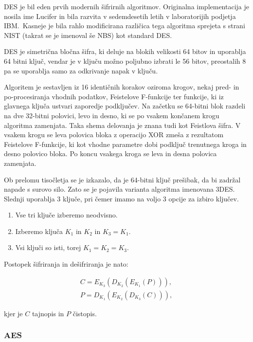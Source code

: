 \documentclass[12pt,a4paper,openany,tikz]{book}
\theoremstyle{plain}
\theoremstyle{definition}
\begin{document}
\gls{DES} je bil eden prvih modernih šifrirnih algoritmov. Originalna implementacija je nosila ime Lucifer in bila razvita v sedemdesetih letih v laboratorijih podjetja IBM.\  Kasneje je bila rahlo modificirana različica tega algoritma sprejeta s strani \acrshort{NIST} (takrat se je imenoval še \acrshort{NBS}) kot standard \gls{DES}.

\gls{DES} je simetrična bločna šifra, ki deluje na blokih velikosti 64 bitov in uporablja 64 bitni ključ, vendar je v ključu možno poljubno izbrati le 56 bitov, preostalih 8 pa se uporablja samo za odkrivanje napak v ključu.

Algoritem je sestavljen iz 16 identičnih korakov oziroma krogov, nekaj pred- in po-procesiranja vhodnih podatkov, Feistelove F-funkcije ter funkcije, ki iz glavnega ključa ustvari zaporedje podključev. Na začetku se 64-bitni blok razdeli na dve 32-bitni polovici, levo in desno, ki se po vsakem končanem krogu algoritma zamenjata. Taka shema delovanja je znana tudi kot Feistlova šifra. V vsakem krogu se leva polovica bloka z operacijo \rm{XOR} zmeša z rezultatom Feistelove F-funkcije, ki kot vhodne parametre dobi podključ trenutnega kroga in desno polovico bloka. Po koncu vsakega kroga se leva in desna polovica zamenjata.

Ob prelomu tisočletja se je izkazalo, da je 64-bitni ključ prešibak, da bi zadržal napade s surovo silo. Zato se je pojavila varianta algoritma imenovana 3DES. Slednji uporablja 3 ključe, pri čemer imamo na voljo 3 opcije za izbiro ključev.

\begin{enumerate}
\item Vse tri ključe izberemo neodvisno.
\item Izberemo ključa $K_1$ in $K_2$ in $K_3=K_1$.
\item Vsi ključi so isti, torej $K_1=K_2=K_3$.
\end{enumerate}

Postopek šifriranja in dešifriranja je nato:

\begin{gather*}
C=E_{K_3}(D_{K_2}(E_{K_1}(P))), \\
P=D_{K_1}(E_{K_2}(D_{K_3}(C))),
\end{gather*}

kjer je $C$ tajnopis in $P$ čistopis.

\subsubsection{AES}
\label{subs:AES}
\end{document}
